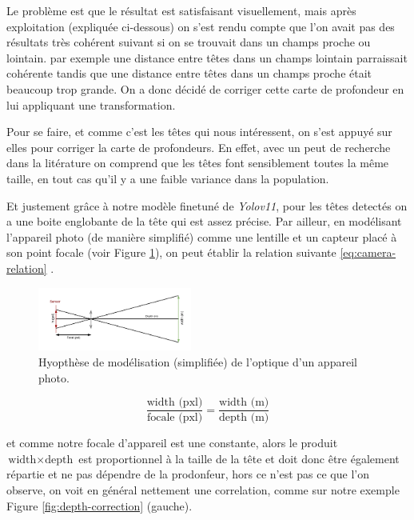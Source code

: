 
Le problème est que le résultat est satisfaisant visuellement, mais après exploitation (expliquée ci-dessous) on s'est rendu compte que l'on avait pas des résultats très cohérent suivant si on se trouvait dans un champs proche ou lointain. par exemple une distance entre têtes dans un champs lointain parraissait cohérente tandis que une distance entre têtes dans un champs proche était beaucoup trop grande. On a donc décidé de corriger cette carte de profondeur en lui appliquant une transformation.

Pour se faire, et comme c'est les têtes qui nous intéressent, on s'est appuyé sur elles pour corriger la carte de profondeurs. En effet, avec un peut de recherche dans la litérature on comprend que les têtes font sensiblement toutes la même taille, en tout cas qu'il y a une faible variance dans la population.

Et justement grâce à notre modèle finetuné de \textit{Yolov11}, pour les têtes detectés on a une boite englobante de la tête qui est assez précise. Par ailleur,  en modélisant l'appareil photo (de manière simplifié) comme une lentille et un capteur placé à son point focale (voir Figure \ref{fig:model-camera}), on peut établir la relation suivante \ref{eq:camera-relation} .

\begin{figure}[h!]
    \centering
    \includegraphics[width=0.45\textwidth]{images/app_photo_model.drawio.png}
    \caption{Hyopthèse de modélisation (simplifiée) de l'optique d'un appareil photo.}
    \label{fig:model-camera}
\end{figure}

\begin{equation} \label{eq:camera-relation}
    \frac{\text{width (pxl)}}{\text{focale (pxl)}} = \frac{\text{width (m)}}{\text{depth (m)}}
\end{equation}


et comme notre focale d'appareil est une constante, alors le produit $ \text{width} \times \text{depth} $  est proportionnel à la taille de la tête et doit donc être également répartie et ne pas dépendre de la prodonfeur, hors ce n'est pas ce que l'on observe, on voit en général nettement une correlation, comme sur notre exemple Figure \ref{fig:depth-correction} (gauche). 

